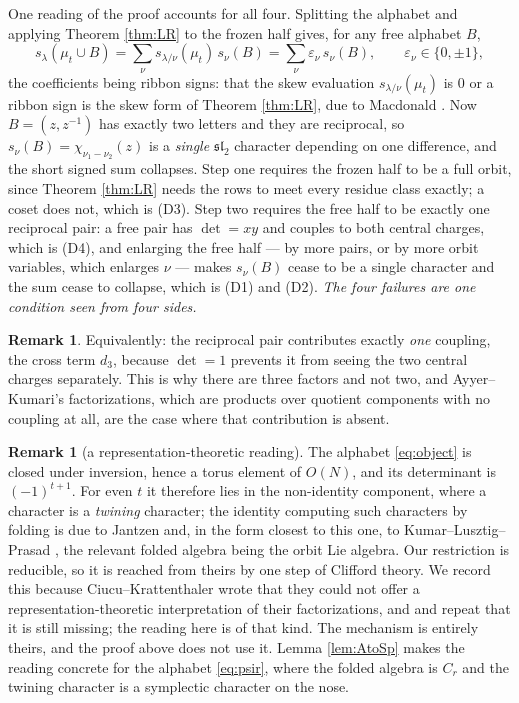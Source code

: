 \documentclass[11pt,reqno]{amsart}
\theoremstyle{plain}
\theoremstyle{definition}
\newtheorem{remark}[theorem]{Remark}
\newcommand{\zt}{\mu_t}
\begin{document}
One reading of the proof accounts for all four. Splitting the alphabet and applying Theorem
\ref{thm:LR} to the frozen half gives, for any free alphabet $B$,
\begin{equation}\label{eq:threestep}
s_\lambda(\zt\cup B)=\sum_{\nu}s_{\lambda/\nu}(\zt)\,s_\nu(B)=\sum_\nu\varepsilon_\nu\,s_\nu(B),
\qquad \varepsilon_\nu\in\{0,\pm1\},
\end{equation}
the coefficients being ribbon signs: that the skew evaluation $s_{\lambda/\nu}(\zt)$ is $0$ or a
ribbon sign is the skew form of Theorem \ref{thm:LR}, due to Macdonald \cite[p.~91]{Mac95}. Now
$B=(z,z^{-1})$ has exactly two letters and they are
reciprocal, so $s_\nu(B)=\chi_{\nu_1-\nu_2}(z)$ is a \emph{single} $\mathfrak{sl}_2$ character
depending on one difference, and the short signed sum collapses. Step one requires the frozen half
to be a full orbit, since Theorem \ref{thm:LR} needs the rows to meet every residue class exactly;
a coset does not, which is (D3). Step two requires the free half to be exactly one reciprocal pair:
a free pair has $\det=xy$ and couples to both central charges, which is (D4), and enlarging the free
half --- by more pairs, or by more orbit variables, which enlarges $\nu$ --- makes $s_\nu(B)$ cease
to be a single character and the sum cease to collapse, which is (D1) and (D2). \emph{The four
failures are one condition seen from four sides.}

\begin{remark}
Equivalently: the reciprocal pair contributes exactly \emph{one} coupling, the cross term $d_3$,
because $\det=1$ prevents it from seeing the two central charges separately. This is why there are
three factors and not two, and Ayyer--Kumari's factorizations, which are products over quotient
components with no coupling at all, are the case where that contribution is absent.
\end{remark}

\begin{remark}[a representation-theoretic reading]\label{rem:twining}
The alphabet \eqref{eq:object} is closed under inversion, hence a torus element of $O(N)$, and its
determinant is $(-1)^{t+1}$. For even $t$ it therefore lies in the non-identity component, where a
character is a \emph{twining} character; the identity computing such characters by folding is due to
Jantzen \cite{Jantzen} and, in the form closest to this one, to Kumar--Lusztig--Prasad \cite{KLP},
the relevant folded algebra being the orbit Lie algebra. Our restriction is reducible, so it is
reached from theirs by one step of Clifford theory. We record this because Ciucu--Krattenthaler
\cite{CK09} wrote that they could not offer a representation-theoretic interpretation of their
factorizations, and \cite{AB19} and \cite{AK25} repeat that it is still missing; the reading here is
of that kind. The mechanism is entirely theirs, and the proof above does not use it. Lemma
\ref{lem:AtoSp} makes the reading concrete for the alphabet \eqref{eq:psir}, where the folded algebra
is $C_r$ and the twining character is a symplectic character on the nose.
\end{remark}
\end{document}
